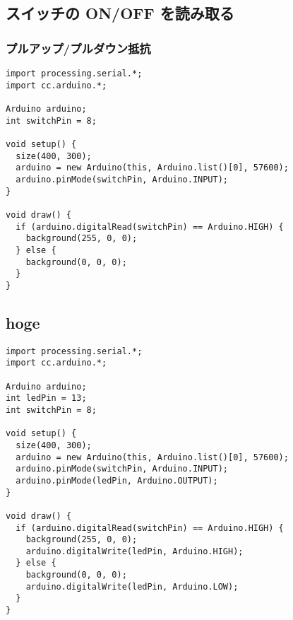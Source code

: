 \documentclass[11pt,a4paper]{jarticle}
\begin{document}
\subsection*{スイッチの ON/OFF を読み取る}
\subsubsection*{プルアップ/プルダウン抵抗}
\begin{lstlisting}
import processing.serial.*;
import cc.arduino.*;

Arduino arduino;
int switchPin = 8;
 
void setup() {
  size(400, 300);
  arduino = new Arduino(this, Arduino.list()[0], 57600);
  arduino.pinMode(switchPin, Arduino.INPUT);  
}
 
void draw() {
  if (arduino.digitalRead(switchPin) == Arduino.HIGH) {
    background(255, 0, 0);
  } else {
    background(0, 0, 0);
  }
}
\end{lstlisting}





\subsection*{hoge}

\begin{lstlisting}
import processing.serial.*;
import cc.arduino.*;

Arduino arduino;
int ledPin = 13;
int switchPin = 8;
 
void setup() {
  size(400, 300);
  arduino = new Arduino(this, Arduino.list()[0], 57600);
  arduino.pinMode(switchPin, Arduino.INPUT);  
  arduino.pinMode(ledPin, Arduino.OUTPUT);
}
 
void draw() {
  if (arduino.digitalRead(switchPin) == Arduino.HIGH) {
    background(255, 0, 0);
    arduino.digitalWrite(ledPin, Arduino.HIGH);
  } else {
    background(0, 0, 0);
    arduino.digitalWrite(ledPin, Arduino.LOW);
  }
}
\end{lstlisting}
\end{document}
